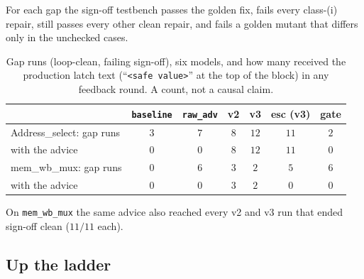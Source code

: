 \documentclass[11pt]{article}
\newcommand{\cond}[1]{\texttt{#1}}
\begin{document}
For each gap the sign-off testbench passes the golden fix, fails every class-(i)
repair, still passes every other clean repair, and fails a golden mutant that
differs only in the unchecked cases.

\begin{table}[htbp]
\centering
\caption{Gap runs (loop-clean, failing sign-off), six models, and how many
received the production latch text (``\texttt{<safe value>}'' at the top of the
block) in any feedback round. A count, not a causal claim.}
\label{tab:s-p3-advice}
\small
\begin{tabular}{@{}l c c c c c c@{}}
\toprule
 & \cond{baseline} & \cond{raw\_adv} & \textbf{v2} & \textbf{v3} & \textbf{esc (v3)} & \textbf{gate} \\
\midrule
Address\_select: gap runs       & $3$ & $7$ & $8$ & $12$ & $11$ & $2$ \\
\quad with the advice           & $0$ & $0$ & $8$ & $12$ & $11$ & $0$ \\
mem\_wb\_mux: gap runs          & $0$ & $6$ & $3$ & $2$  & $5$  & $6$ \\
\quad with the advice           & $0$ & $0$ & $3$ & $2$  & $0$  & $0$ \\
\bottomrule
\end{tabular}
\end{table}

On \texttt{mem\_wb\_mux} the same advice also reached every v2 and v3 run that
ended sign-off clean ($11/11$ each).

\subsection{Up the ladder}
\end{document}
